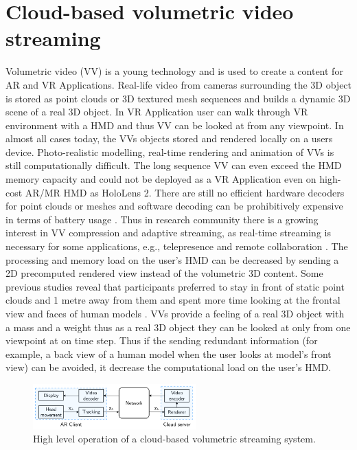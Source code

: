 \section{Cloud-based volumetric video streaming}
\label{sec:theorie:cloud}
Volumetric video (VV) is a young technology and is used to create a content for AR and VR Applications. Real-life video from cameras surrounding the 3D object is stored as point clouds or 3D textured mesh sequences and builds a dynamic 3D scene of a real 3D object. In VR Application user can walk through VR environment with a HMD and thus VV can be looked at from any viewpoint. In almost all cases today, the VVs objects stored and rendered locally on a users device. Photo-realistic modelling, real-time rendering and animation of VVs is still computationally difficult. The long sequence VV can even exceed the HMD memory capacity and could not be deployed as a VR Application even on high-cost AR/MR HMD as HoloLens 2. There are still no efficient hardware decoders for point clouds or meshes and software decoding can be prohibitively expensive in terms of battery usage \cite{serhan_kalman}. Thus in research community there is a growing interest in VV compression and adaptive streaming, as real-time streaming is necessary for some applications, e.g., telepresence and remote collaboration \cite{user_behav_volumetric}. The processing and memory load on the user's HMD can be decreased by sending a 2D precomputed rendered view instead of the volumetric 3D content. Some previous studies reveal that participants preferred to stay in front of static point clouds and 1 metre away from them and spent more time looking at the frontal view and faces of human models \cite{user_behav_volumetric}. VVs provide a feeling of a real 3D object with a mass and a weight thus as a real 3D object they can be looked at only from one viewpoint at on time step. Thus if the sending redundant information (for example, a back view of a human model when the user looks at model's front view) can be avoided, it decrease the computational load on the user's HMD.
\begin{figure}
	\centering
	\includegraphics[width=0.56\textwidth]{gfx/cloud.png}
	\caption{\label{fig:cloud}High level operation of a cloud-based volumetric streaming system.}
\end{figure}


